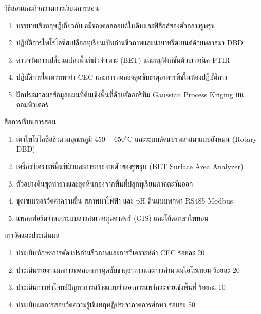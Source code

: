 \newpage

\begin{planbox}{วิธีสอนและกิจกรรมการเรียนการสอน}
\begin{enumerate}
    \item บรรยายเชิงทฤษฎีเกี่ยวกับเคมีของคอลลอยด์ในดินและฟิสิกส์ของตัวกลางรูพรุน
    \item ปฏิบัติการไพโรไลซิสเปลือกทุเรียนเป็นถ่านชีวภาพและนำมาทรีตเมนต์ด้วยพลาสมา DBD
    \item ตรวจวัดการเปลี่ยนแปลงพื้นที่ผิวจำเพาะ (BET) และหมู่ฟังก์ชันด้วยเทคนิค FTIR
    \item ปฏิบัติการไตเตรทหาค่า CEC และการทดลองดูดซับธาตุอาหารพืชในห้องปฏิบัติการ
    \item ฝึกประมวลผลข้อมูลแผนที่ดินเชิงพื้นที่ด้วยอัลกอริทึม Gaussian Process Kriging บนคอมพิวเตอร์
\end{enumerate}
\end{planbox}

\begin{planbox}{สื่อการเรียนการสอน}
\begin{enumerate}
    \item เตาไพโรไลซิสชีวมวลอุณหภูมิ $450 - 650^\circ\text{C}$ และระบบดัดแปรพลาสมาแบบถังหมุน (Rotary DBD)
    \item เครื่องวิเคราะห์พื้นที่ผิวและการกระจายตัวของรูพรุน (BET Surface Area Analyzer)
    \item ตัวอย่างดินชุดท่ายางและชุดหินกองจากพื้นที่ปลูกทุเรียนภาคตะวันออก
    \item ชุดเซนเซอร์วัดค่าความชื้น สภาพนำไฟฟ้า และ pH ดินแบบพกพา RS485 Modbus
    \item แพลตฟอร์มจำลองระบบสารสนเทศภูมิศาสตร์ (GIS) และโค้ดภาษาไพทอน
\end{enumerate}
\end{planbox}

\begin{planbox}{การวัดและประเมินผล}
\begin{enumerate}
    \item ประเมินทักษะการดัดแปรถ่านชีวภาพและการวิเคราะห์ค่า CEC ร้อยละ 20
    \item ประเมินรายงานผลการทดลองการดูดซับธาตุอาหารและการคำนวณไอโซเทอม ร้อยละ 20
    \item ประเมินการทำโจทย์ปัญหาการสร้างแบบจำลองการแพร่กระจายเชิงพื้นที่ ร้อยละ 10
    \item ประเมินผลการสอบวัดความรู้เชิงทฤษฎีประจำภาคการศึกษา ร้อยละ 50
\end{enumerate}
\end{planbox}

